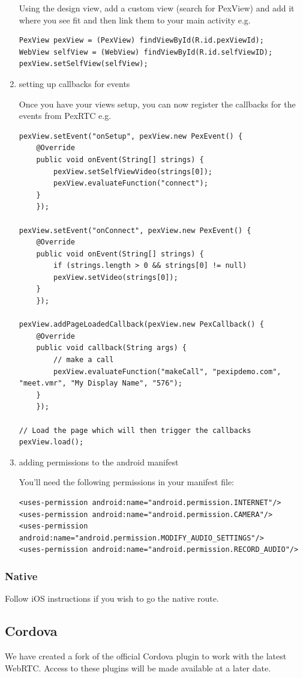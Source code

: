 \documentclass[a4paper,11pt]{article}
\begin{document}
\begin{enumerate}
Using the design view, add a custom view (search for PexView) and add
it where you see fit and then link them to your main activity e.g.

\begin{verbatim}
PexView pexView = (PexView) findViewById(R.id.pexViewId);
WebView selfView = (WebView) findViewById(R.id.selfViewID);
pexView.setSelfView(selfView);
\end{verbatim}

\item setting up callbacks for events
\label{sec:org1876b39}

Once you have your views setup, you can now register the callbacks for
the events from PexRTC e.g.

\begin{verbatim}
pexView.setEvent("onSetup", pexView.new PexEvent() {
	@Override
	public void onEvent(String[] strings) {
	    pexView.setSelfViewVideo(strings[0]);
	    pexView.evaluateFunction("connect");
	}
    });

pexView.setEvent("onConnect", pexView.new PexEvent() {
	@Override
	public void onEvent(String[] strings) {
	    if (strings.length > 0 && strings[0] != null)
		pexView.setVideo(strings[0]);
	}
    });

pexView.addPageLoadedCallback(pexView.new PexCallback() {
	@Override
	public void callback(String args) {
	    // make a call
	    pexView.evaluateFunction("makeCall", "pexipdemo.com", "meet.vmr", "My Display Name", "576");
	}
    });

// Load the page which will then trigger the callbacks
pexView.load();
\end{verbatim}

\item adding permissions to the android manifest
\label{sec:orgd2d2187}

You'll need the following permissions in your manifest file:

\begin{verbatim}
<uses-permission android:name="android.permission.INTERNET"/>
<uses-permission android:name="android.permission.CAMERA"/>
<uses-permission android:name="android.permission.MODIFY_AUDIO_SETTINGS"/>
<uses-permission android:name="android.permission.RECORD_AUDIO"/>
\end{verbatim}
\end{enumerate}

\subsubsection{Native}
\label{sec:org3089b9e}

Follow iOS instructions if you wish to go the native route.

\subsection{Cordova}
\label{sec:org3609769}

We have created a fork of the official Cordova plugin to work with the
latest WebRTC.  Access to these plugins will be made available at a
later date.
\end{document}
